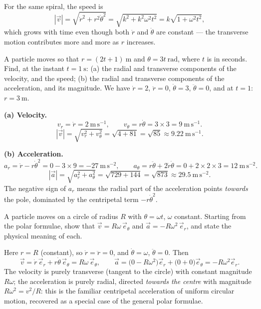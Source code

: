 \documentclass[11pt]{article}
\begin{document}
\begin{exemplebox}
For the same spiral, the speed is
\[
|\vec v|=\sqrt{\dot r^{2}+r^{2}\dot\theta^{2}}=\sqrt{k^{2}+k^{2}\omega^{2}t^{2}}=k\sqrt{1+\omega^{2}t^{2}},
\]
which grows with time even though both $\dot r$ and $\dot\theta$ are constant — the transverse motion contributes more and more as $r$ increases.
\end{exemplebox}

\begin{exoresolu}
A particle moves so that $r=(2t+1)\ \mathrm{m}$ and $\theta=3t\ \mathrm{rad}$, where $t$ is in seconds. Find, at the instant $t=1\ \mathrm{s}$: (a) the radial and transverse components of the velocity, and the speed; (b) the radial and transverse components of the acceleration, and its magnitude.
\tcblower
We have $\dot r=2$, $\ddot r=0$, $\dot\theta=3$, $\ddot\theta=0$, and at $t=1$: $r=3\ \mathrm{m}$.

\textbf{(a) Velocity.}
\[
v_r=\dot r=2\ \mathrm{m\,s^{-1}},\qquad
v_\theta=r\dot\theta=3\times3=9\ \mathrm{m\,s^{-1}} .
\]
\[
|\vec v|=\sqrt{v_r^{2}+v_\theta^{2}}=\sqrt{4+81}=\sqrt{85}\approx9.22\ \mathrm{m\,s^{-1}} .
\]

\textbf{(b) Acceleration.}
\[
a_r=\ddot r-r\dot\theta^{2}=0-3\times9=-27\ \mathrm{m\,s^{-2}},
\qquad
a_\theta=r\ddot\theta+2\dot r\dot\theta=0+2\times2\times3=12\ \mathrm{m\,s^{-2}} .
\]
\[
|\vec a|=\sqrt{a_r^{2}+a_\theta^{2}}=\sqrt{729+144}=\sqrt{873}\approx29.5\ \mathrm{m\,s^{-2}} .
\]
The negative sign of $a_r$ means the radial part of the acceleration points \emph{towards} the pole, dominated by the centripetal term $-r\dot\theta^2$.
\end{exoresolu}

\begin{exercice}
A particle moves on a circle of radius $R$ with $\theta=\omega t$, $\omega$ constant. Starting from the polar formulae, show that $\vec v=R\omega\,\vec e_\theta$ and $\vec a=-R\omega^{2}\,\vec e_r$, and state the physical meaning of each.
\end{exercice}

\begin{corrige}[Exercise 1]
Here $r=R$ (constant), so $\dot r=\ddot r=0$, and $\dot\theta=\omega$, $\ddot\theta=0$. Then
\[
\vec v=\dot r\,\vec e_r+r\dot\theta\,\vec e_\theta=R\omega\,\vec e_\theta,
\qquad
\vec a=\bigl(0-R\omega^{2}\bigr)\vec e_r+\bigl(0+0\bigr)\vec e_\theta=-R\omega^{2}\vec e_r .
\]
The velocity is purely transverse (tangent to the circle) with constant magnitude $R\omega$; the acceleration is purely radial, directed \emph{towards the centre} with magnitude $R\omega^2=v^2/R$: this is the familiar centripetal acceleration of uniform circular motion, recovered as a special case of the general polar formulae.
\end{corrige}
\end{document}
